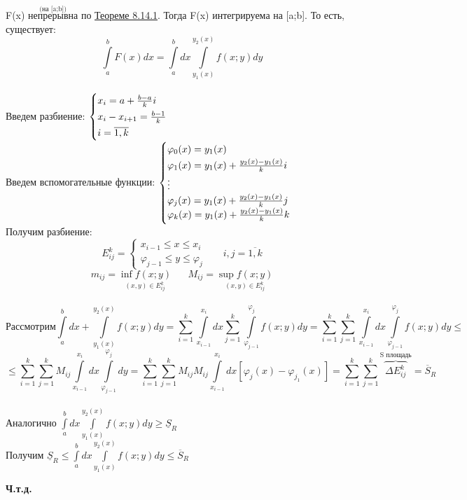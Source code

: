 \documentclass[12pt]{article}
\let\oldint\int
\let\oldsum\sum
\renewcommand{\int}{\oldint\limits}
\renewcommand{\sum}{\oldsum\limits}
\begin{document}
  \begin{adjustwidth}{1.5em}{1.5em}
    F(x) $\overset{\text{(на [a;b])}}{\text{непрерывна}}$ по \hyperref[th:8.14.1]{Теореме 8.14.1}. Тогда F(x)
    интегрируема на [a;b]. То есть, существует: \[\int_{a}^{b}F(x)dx=\int_{a}^{b}dx \int_{y_1(x)}^{y_2(x)}
    f(x;y)dy\]\\
    Введем разбиение:
    $\begin{cases}
      \vspace{2pt}
      x_i = a + \frac{b-a}{k}i \\
      \vspace{2pt}
      x_i-x_{i+1}=\frac{b-1}{k} \\
      i=\overline{1,k}
    \end{cases}$\\
    Введем вспомогательные функции:
    $\begin{cases}
      \vspace{2pt}
      \varphi_0(x)=y_1(x)\\
      \vspace{2pt}
      \varphi_1(x)=y_1(x)+\frac{y_2(x)-y_1(x)}{k}i\\
      \vdots\\
      \varphi_j(x)=y_1(x)+\frac{y_2(x)-y_1(x)}{k}j\\
      \vspace{2pt}
      \varphi_k(x)=y_1(x)+\frac{y_2(x)-y_1(x)}{k}k
    \end{cases}$\\
    Получим разбиение: 
    \[E^{k}_{ij}=
    \begin{cases}
      x_{i-1}\leq x \leq x_i\\
      \varphi_{j-1}\leq y\leq \varphi_j
    \end{cases} \hspace{20pt} i,j = \overline{1,k}\]
    \[m_{ij}=\underset{(x,y) \in E_{ij}^k}{\inf f(x;y)} \hspace{20pt} M_{ij}=\underset{(x,y) \in E_{ij}^k}{\sup f(x;y)}\]\\
    \[ \text{Рассмотрим} 
    \int_{a}^{b}dx+\int_{y_1(x)}^{y_2(x)}f(x;y)dy =
    \sum_{i=1}^{k} \int_{x_{i-1}}^{x_i}dx \sum_{j=1}^{k} \int_{\varphi_{j-1}}^{\varphi_j}f(x;y)dy =
    \sum_{i=1}^{k}\sum_{j=1}^{k} \int_{x_{i-1}}^{x_i} dx\int_{\varphi_{j-1}}^{\varphi_j}f(x;y)dy \leq\]
    \[\leq \sum_{i=1}^{k}\sum_{j=1}^{k} M_{ij} \int_{x_{i-1}}^{x_i}dx \int_{\varphi_{j-1}}^{\varphi_j}dy=
    \sum_{i=1}^{k}\sum_{j=1}^{k} M_{ij} M_{ij} \int_{x_{i-1}}^{x_i}dx[\varphi_j(x)-\varphi_{j_1}(x)]=
    \sum_{i=1}^{k}\sum_{j=1}^{k} \overbrace{\Delta E_{ij}^k}^{\text{S площадь}}=
    \overline{S}_R\]\\
    Аналогично $\int_{a}^{b}dx \int_{y_1(x)}^{y_2(x)}f(x;y)dy \geq \underline{S}_R$\\
    Получим $\underline{S}_R \leq \int_{a}^{b}dx \int_{y_1(x)}^{y_2(x)} f(x;y) dy \leq \overline{S}_R$
    \begin{center}
      \textbf{Ч.т.д.}
    \end{center}
  \end{adjustwidth}
\end{document}
